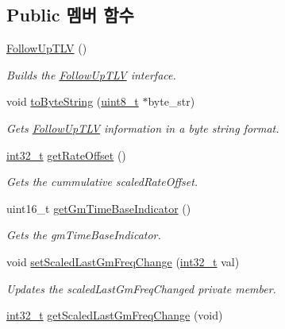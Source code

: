 \subsection*{Public 멤버 함수}
\begin{DoxyCompactItemize}
\item 
\hyperlink{class_follow_up_t_l_v_aac1e153784ab7860dadbf706d4898e41}{Follow\+Up\+T\+LV} ()
\begin{DoxyCompactList}\small\item\em Builds the \hyperlink{class_follow_up_t_l_v}{Follow\+Up\+T\+LV} interface. \end{DoxyCompactList}\item 
void \hyperlink{class_follow_up_t_l_v_acd2477c3b4df4f055d57ceae73e545a0}{to\+Byte\+String} (\hyperlink{stdint_8h_aba7bc1797add20fe3efdf37ced1182c5}{uint8\+\_\+t} $\ast$byte\+\_\+str)
\begin{DoxyCompactList}\small\item\em Gets \hyperlink{class_follow_up_t_l_v}{Follow\+Up\+T\+LV} information in a byte string format. \end{DoxyCompactList}\item 
\hyperlink{parse_8c_a37994e3b11c72957c6f454c6ec96d43d}{int32\+\_\+t} \hyperlink{class_follow_up_t_l_v_a2a33a47008ba66b8d4c85265f0b825d3}{get\+Rate\+Offset} ()
\begin{DoxyCompactList}\small\item\em Gets the cummulative scaled\+Rate\+Offset. \end{DoxyCompactList}\item 
uint16\+\_\+t \hyperlink{class_follow_up_t_l_v_a2690d0ae7d3d031179c731082e3bd451}{get\+Gm\+Time\+Base\+Indicator} ()
\begin{DoxyCompactList}\small\item\em Gets the gm\+Time\+Base\+Indicator. \end{DoxyCompactList}\item 
void \hyperlink{class_follow_up_t_l_v_a00695cdf1b36c99d1b5cc6edd5f69662}{set\+Scaled\+Last\+Gm\+Freq\+Change} (\hyperlink{parse_8c_a37994e3b11c72957c6f454c6ec96d43d}{int32\+\_\+t} val)
\begin{DoxyCompactList}\small\item\em Updates the scaled\+Last\+Gm\+Freq\+Changed private member. \end{DoxyCompactList}\item 
\hyperlink{parse_8c_a37994e3b11c72957c6f454c6ec96d43d}{int32\+\_\+t} \hyperlink{class_follow_up_t_l_v_aa36136e3ef319390c0a647980c4a58dd}{get\+Scaled\+Last\+Gm\+Freq\+Change} (void)

\end{DoxyCompactItemize}
